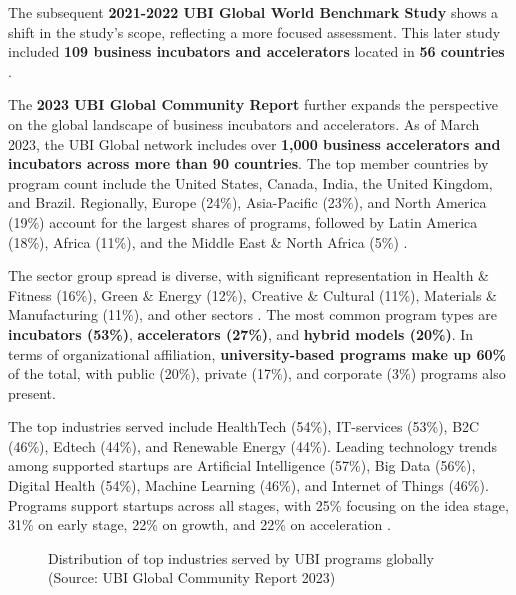 \documentclass[../Main.tex]{subfiles}%
\begin{document}
	The subsequent \textbf{2021-2022 UBI Global World Benchmark Study} shows a shift in the study's scope, reflecting a more focused assessment. This later study included \textbf{109 business incubators and accelerators} located in \textbf{56 countries} \cite{ubi2021world}.

	The \textbf{2023 UBI Global Community Report} further expands the perspective on the global landscape of business incubators and accelerators. As of March 2023, the UBI Global network includes over \textbf{1,000 business accelerators and incubators across more than 90 countries}. The top member countries by program count include the United States, Canada, India, the United Kingdom, and Brazil. Regionally, Europe (24\%), Asia-Pacific (23\%), and North America (19\%) account for the largest shares of programs, followed by Latin America (18\%), Africa (11\%), and the Middle East \& North Africa (5\%) \cite{Amin2024Incubators}.

	The sector group spread is diverse, with significant representation in Health \& Fitness (16\%), Green \& Energy (12\%), Creative \& Cultural (11\%), Materials \& Manufacturing (11\%), and other sectors \cite{Amin2024Incubators}. The most common program types are \textbf{incubators (53\%)}, \textbf{accelerators (27\%)}, and \textbf{hybrid models (20\%)}. In terms of organizational affiliation, \textbf{university-based programs make up 60\%} of the total, with public (20\%), private (17\%), and corporate (3\%) programs also present.

	The top industries served include HealthTech (54\%), IT-services (53\%), B2C (46\%), Edtech (44\%), and Renewable Energy (44\%). Leading technology trends among supported startups are Artificial Intelligence (57\%), Big Data (56\%), Digital Health (54\%), Machine Learning (46\%), and Internet of Things (46\%). Programs support startups across all stages, with 25\% focusing on the idea stage, 31\% on early stage, 22\% on growth, and 22\% on acceleration \cite{Amin2024Incubators}.

	\begin{figure}[h]
		\centering
		\caption{Distribution of top industries served by UBI programs globally (Source: UBI Global Community Report 2023)}
		\label{fig:top_industries}
	\end{figure}
\end{document}
